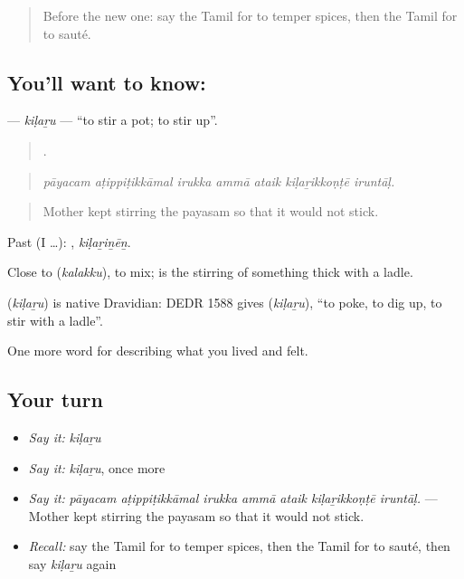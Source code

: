 \label{lesson:TA-C526-kilaru}



\begin{quote}
Before the new one: say the Tamil for to temper spices, then the Tamil for to sauté.
\end{quote}

\subsection*{You'll want to know: }
\textbf{} — \emph{kiḷaṟu} — \textquotedblleft{}to stir a pot; to stir up\textquotedblright{}.

\begin{quote}
      .
\end{quote}

\begin{quote}
\emph{pāyacam aṭippiṭikkāmal irukka ammā ataik kiḷaṟikkoṇṭē iruntāḷ.}
\end{quote}

\begin{quote}
Mother kept stirring the payasam so that it would not stick.
\end{quote}

Past (I …): , \emph{kiḷaṟiṉēṉ}.

Close to  (\emph{kalakku}), to mix;  is the stirring of something thick with a ladle.

\begin{cousinweb}
\textbf{} (\emph{kiḷaṟu}) is native Dravidian: DEDR 1588 gives  (\emph{kiḷaṟu}), \textquotedblleft{}to poke, to dig up, to stir with a ladle\textquotedblright{}.
\end{cousinweb}

\begin{grammarlens}[title={What you've built}]
One more word for describing what you lived and felt.
\end{grammarlens}

\subsection*{Your turn}
\begin{itemize}
\raggedright
  \item \emph{Say it:} \emph{kiḷaṟu}
  \item \emph{Say it:} \emph{kiḷaṟu}, once more
  \item \emph{Say it:} \emph{pāyacam aṭippiṭikkāmal irukka ammā ataik kiḷaṟikkoṇṭē iruntāḷ.} — Mother kept stirring the payasam so that it would not stick.
  \item \emph{Recall:} say the Tamil for to temper spices, then the Tamil for to sauté, then say \emph{kiḷaṟu} again
\end{itemize}

